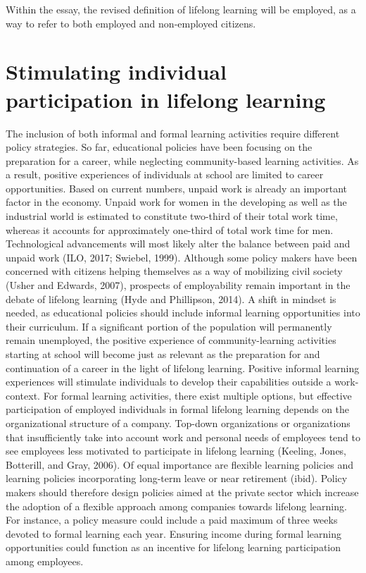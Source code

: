 Within the essay, the revised definition of lifelong learning will be employed, as a way to refer to both employed and non-employed citizens.

\section*{Stimulating individual participation in lifelong learning}

The inclusion of both informal and formal learning activities require different policy strategies. So far, educational policies have been focusing on the preparation for a career, while neglecting community-based learning activities. As a result, positive experiences of individuals at school are limited to career opportunities. Based on current numbers, unpaid work is already an important factor in the economy. Unpaid work for women in the developing as well as the industrial world is estimated to constitute two-third of their total work time, whereas it accounts for approximately one-third of total work time for men. Technological advancements will most likely alter the balance between paid and unpaid work (ILO, 2017; Swiebel, 1999). Although some policy makers have been concerned with citizens helping themselves as a way of mobilizing civil society (Usher and Edwards, 2007), prospects of employability remain important in the debate of lifelong learning (Hyde and Phillipson, 2014). A shift in mindset is needed, as educational policies should include informal learning opportunities into their curriculum. If a significant portion of the population will permanently remain unemployed, the positive experience of community-learning activities starting at school will become just as relevant as the preparation for and continuation of a career in the light of lifelong learning. Positive informal learning experiences will stimulate individuals to develop their capabilities outside a work-context. 
For formal learning activities, there exist multiple options, but effective participation of employed individuals in formal lifelong learning depends on the organizational structure of a company. Top-down organizations or organizations that insufficiently take into account work and personal needs of employees tend to see employees less motivated to participate in lifelong learning (Keeling, Jones, Botterill, and Gray, 2006). Of equal importance are flexible learning policies and learning policies incorporating long-term leave or near retirement (ibid). Policy makers should therefore design policies aimed at the private sector which increase the adoption of a flexible approach among companies towards lifelong learning. For instance, a policy measure could include a paid maximum of three weeks devoted to formal learning each year. Ensuring income during formal learning opportunities could function as an incentive for lifelong learning participation among employees.

